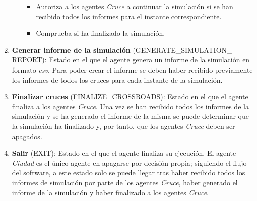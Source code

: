 \begin{enumerate}
\begin{itemize}
\begin{itemize}
                \item Autoriza a los agentes \textit{Cruce} a continuar la simulación si se han recibido todos los informes para el instante correspondiente.
                \item Comprueba si ha finalizado la simulación.
            \end{itemize}
    \end{itemize}
    \item \textbf{Generar informe de la simulación} \footnotesize(GENERATE\_SIMULATION\_ \newline REPORT)\normalsize: Estado en el que el agente genera un informe de la simulación en formato \textit{\acrshort{csv}}. Para poder crear el informe se deben haber recibido previamente los informes de todos los cruces para cada instante de la simulación.
    \item \textbf{Finalizar cruces} \footnotesize(FINALIZE\_CROSSROADS)\normalsize: Estado en el que el agente finaliza a los agentes \textit{Cruce}. Una vez se han recibido todos los informes de la simulación y se ha generado el informe de la misma se puede determinar que la simulación ha finalizado y, por tanto, que los agentes \textit{Cruce} deben ser apagados.
    \item \textbf{Salir} \footnotesize(EXIT)\normalsize: Estado en el que el agente finaliza su ejecución. El agente \textit{Ciudad} es el único agente en apagarse por decisión propia; siguiendo el flujo del software, a este estado solo se puede llegar tras haber recibido todos los informes de simulación por parte de los agentes \textit{Cruce}, haber generado el informe de la simulación y haber finalizado a los agentes \textit{Cruce}.
\end{enumerate}

